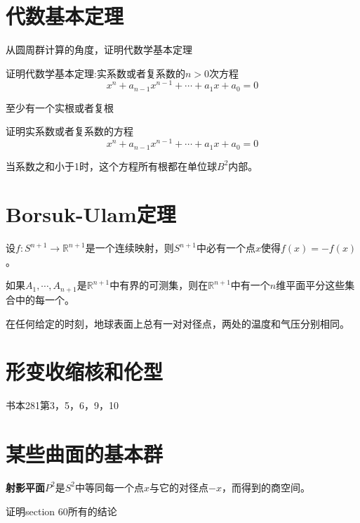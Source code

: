 \section{代数基本定理}

从圆周群计算的角度，证明代数学基本定理

\begin{mdframed}
    \begin{question}
        证明代数学基本定理:实系数或者复系数的$n>0$次方程
        \begin{equation}
            x^n+a_{n-1}x^{n-1}+\cdots+a_1x+a_0=0
        \end{equation}

        至少有一个实根或者复根
    \end{question}
\end{mdframed}

\begin{mdframed}
    \begin{question}
        证明实系数或者复系数的方程
        \begin{equation}
            x^n+a_{n-1}x^{n-1}+\cdots+a_1x+a_0=0
        \end{equation}

        当系数之和小于1时，这个方程所有根都在单位球$B^2$内部。
    \end{question}
\end{mdframed}

\section{Borsuk-Ulam定理}

\begin{mdframed}
    \begin{question}
        设$f:S^{n+1}\rightarrow \mathbb{R}^{n+1}$是一个连续映射，则$S^{n+1}$中必有一个点$x$使得$f(x)=-f(x)$。
    \end{question}
\end{mdframed}

\begin{mdframed}
    \begin{question}
        如果$A_1,\cdots,A_{n+1}$是$\mathbb{R}^{n+1}$中有界的可测集，则在$\mathbb{R}^{n+1}$中有一个$n$维平面平分这些集合中的每一个。
        \end{question}
\end{mdframed}

\begin{mdframed}
    \begin{question}
        在任何给定的时刻，地球表面上总有一对对径点，两处的温度和气压分别相同。
    \end{question}
\end{mdframed}

\section{形变收缩核和伦型}

书本281第3，5，6，9，10


\section{某些曲面的基本群}

\textbf{射影平面}$P^2$是$S^2$中等同每一个点$x$与它的对径点$-x$，而得到的商空间。

证明section 60所有的结论